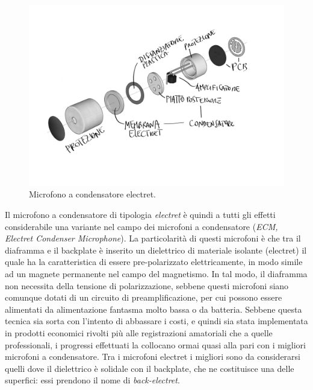 \begin{refsection}
\begin{figure}[h]
\centering
\includegraphics[width=0.99\columnwidth]{CAPITOLI/0200/img/electret.png}
\caption[]{Microfono a condensatore electret.}
\label{mic:electret}
\end{figure}

Il microfono a condensatore di tipologia \emph{electret} è quindi a tutti gli effetti
considerabile una variante nel campo dei microfoni a condensatore (\emph{ECM,
Electret Condenser Microphone}). La particolarità di questi microfoni è che tra
il diaframma e il backplate è inserito un dielettrico di materiale isolante
(electret) il quale ha la caratteristica di essere pre-polarizzato
elettricamente, in modo simile ad un magnete permanente nel campo del magnetismo.
In tal modo, il diaframma non necessita della tensione di polarizzazione,
sebbene questi microfoni siano comunque dotati di un circuito di preamplificazione,
per cui possono essere alimentati da alimentazione fantasma molto bassa o da batteria.
Sebbene questa tecnica sia sorta con l’intento di abbassare i costi, e
quindi sia stata implementata in prodotti economici rivolti più alle registrazioni
amatoriali che a quelle professionali, i progressi effettuati la collocano ormai
quasi alla pari con i migliori microfoni a condensatore. Tra i microfoni electret
i migliori sono da considerarsi quelli dove il dielettrico è solidale con il
backplate, che ne costituisce una delle superfici: essi prendono il nome di
\emph{back-electret}.



\end{refsection}
